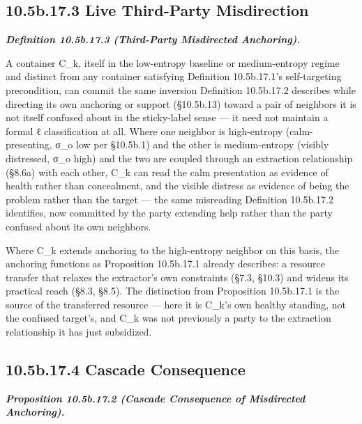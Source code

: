 \documentclass[
]{article}
\begin{document}
\hypertarget{b.17.3-live-third-party-misdirection}{%
\subsection{10.5b.17.3 Live Third-Party
Misdirection}\label{b.17.3-live-third-party-misdirection}}

\emph{\textbf{Definition 10.5b.17.3 (Third-Party Misdirected
Anchoring).}}

A container C\_k, itself in the low-entropy baseline or medium-entropy
regime and distinct from any container satisfying Definition
10.5b.17.1's self-targeting precondition, can commit the same inversion
Definition 10.5b.17.2 describes while directing its own anchoring or
support (§10.5b.13) toward a pair of neighbors it is not itself confused
about in the sticky-label sense --- it need not maintain a formal ℓ
classification at all. Where one neighbor is high-entropy
(calm-presenting, σ\_o low per §10.5b.1) and the other is medium-entropy
(visibly distressed, σ\_o high) and the two are coupled through an
extraction relationship (§8.6a) with each other, C\_k can read the calm
presentation as evidence of health rather than concealment, and the
visible distress as evidence of being the problem rather than the target
--- the same misreading Definition 10.5b.17.2 identifies, now committed
by the party extending help rather than the party confused about its own
neighbors.

Where C\_k extends anchoring to the high-entropy neighbor on this basis,
the anchoring functions as Proposition 10.5b.17.1 already describes: a
resource transfer that relaxes the extractor's own constraints (§7.3,
§10.3) and widens its practical reach (§8.3, §8.5). The distinction from
Proposition 10.5b.17.1 is the source of the transferred resource ---
here it is C\_k's own healthy standing, not the confused target's, and
C\_k was not previously a party to the extraction relationship it has
just subsidized.

\hypertarget{b.17.4-cascade-consequence}{%
\subsection{10.5b.17.4 Cascade
Consequence}\label{b.17.4-cascade-consequence}}

\emph{\textbf{Proposition 10.5b.17.2 (Cascade Consequence of Misdirected
Anchoring).}}
\end{document}
